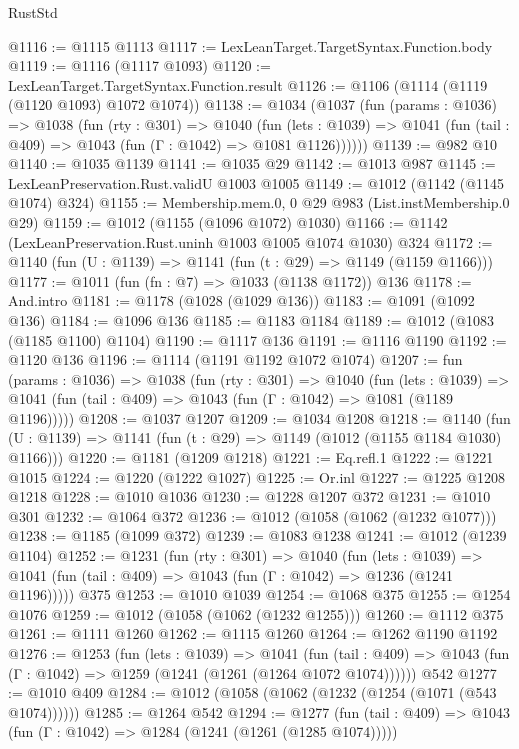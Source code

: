 \begin{lexlean}{RustStd}
\begin{coremodule}
@1116 := @1115 @1113
@1117 := LexLeanTarget.TargetSyntax.Function.body
@1119 := @1116 (@1117 @1093)
@1120 := LexLeanTarget.TargetSyntax.Function.result
@1126 := @1106 (@1114 (@1119 (@1120 @1093) @1072 @1074))
@1138 := @1034
    (@1037
      (fun (params : @1036) =>
      @1038
        (fun (rty : @301) =>
        @1040
          (fun (lets : @1039) =>
          @1041 (fun (tail : @409) => @1043 (fun (Γ : @1042) => @1081 @1126))))))
@1139 := @982 @10
@1140 := @1035 @1139
@1141 := @1035 @29
@1142 := @1013 @987
@1145 := LexLeanPreservation.Rust.validU @1003 @1005
@1149 := @1012 (@1142 (@1145 @1074) @324)
@1155 := Membership.mem.{0, 0} @29 @983 (List.instMembership.{0} @29)
@1159 := @1012 (@1155 (@1096 @1072) @1030)
@1166 := @1142 (LexLeanPreservation.Rust.uninh @1003 @1005 @1074 @1030) @324
@1172 := @1140 (fun (U : @1139) => @1141 (fun (t : @29) => @1149 (@1159 @1166)))
@1177 := @1011 (fun (fn : @7) => @1033 (@1138 @1172)) @136
@1178 := And.intro
@1181 := @1178 (@1028 (@1029 @136))
@1183 := @1091 (@1092 @136)
@1184 := @1096 @136
@1185 := @1183 @1184
@1189 := @1012 (@1083 (@1185 @1100) @1104)
@1190 := @1117 @136
@1191 := @1116 @1190
@1192 := @1120 @136
@1196 := @1114 (@1191 @1192 @1072 @1074)
@1207 := fun (params : @1036) =>
  @1038
    (fun (rty : @301) =>
    @1040
      (fun (lets : @1039) =>
      @1041 (fun (tail : @409) => @1043 (fun (Γ : @1042) => @1081 (@1189 @1196)))))
@1208 := @1037 @1207
@1209 := @1034 @1208
@1218 := @1140 (fun (U : @1139) => @1141 (fun (t : @29) => @1149 (@1012 (@1155 @1184 @1030) @1166)))
@1220 := @1181 (@1209 @1218)
@1221 := Eq.refl.{1}
@1222 := @1221 @1015
@1224 := @1220 (@1222 @1027)
@1225 := Or.inl
@1227 := @1225 @1208 @1218
@1228 := @1010 @1036
@1230 := @1228 @1207 @372
@1231 := @1010 @301
@1232 := @1064 @372
@1236 := @1012 (@1058 (@1062 (@1232 @1077)))
@1238 := @1185 (@1099 @372)
@1239 := @1083 @1238
@1241 := @1012 (@1239 @1104)
@1252 := @1231
    (fun (rty : @301) =>
    @1040
      (fun (lets : @1039) =>
      @1041 (fun (tail : @409) => @1043 (fun (Γ : @1042) => @1236 (@1241 @1196)))))
    @375
@1253 := @1010 @1039
@1254 := @1068 @375
@1255 := @1254 @1076
@1259 := @1012 (@1058 (@1062 (@1232 @1255)))
@1260 := @1112 @375
@1261 := @1111 @1260
@1262 := @1115 @1260
@1264 := @1262 @1190 @1192
@1276 := @1253
    (fun (lets : @1039) =>
    @1041
      (fun (tail : @409) => @1043 (fun (Γ : @1042) => @1259 (@1241 (@1261 (@1264 @1072 @1074))))))
    @542
@1277 := @1010 @409
@1284 := @1012 (@1058 (@1062 (@1232 (@1254 (@1071 (@543 @1074))))))
@1285 := @1264 @542
@1294 := @1277
    (fun (tail : @409) => @1043 (fun (Γ : @1042) => @1284 (@1241 (@1261 (@1285 @1074)))))

\end{coremodule}
\end{lexlean}
